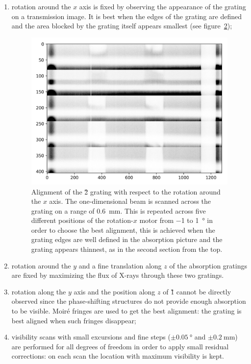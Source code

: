 \begin{enumerate}
\begin{figure}[htb]
            \label{fig:alignment-z}
        \end{figure}
    \item rotation around the $x$ axis is fixed by observing the appearance
        of the grating on a transmission image. It is best when the edges of
        the grating are defined and the area blocked by the grating itself
        appears smallest (see figure~\ref{fig:alignment-x});
        \begin{figure}[htb]
            \centering
            \includegraphics[width=\textwidth]{gfx/alignment-rot-x.png}
            \caption{Alignment of the \G2 grating with respect to the rotation
            around the $x$ axis. The one-dimensional beam is scanned across the
            grating on a range of \SI{0.6}{\milli\metre}. This is repeated across
            five different positions of the rotation-$x$ motor from \num{-1} to
            \SI{+1}{\degree} in order to choose the
            best alignment, this is achieved when the grating edges are well defined in
            the absorption picture and the grating appears thinnest, as in the second
        section from the top.}
            \label{fig:alignment-x}
        \end{figure}
    \item rotation around the $y$ and a fine translation along $z$ of the
        absorption gratings are fixed by maximizing the flux of X-rays
        through these two gratings.
    \item rotation along the $y$ axis and the position along $z$
        of \G{1} cannot be directly observed since the phase-shifting
        structures do not provide enough absorption to be visible.
        Moir\'e fringes are used to get the best alignment: the grating is
        best aligned when such fringes disappear;
    \item visibility scans with small excursions and fine steps
        ($\pm\SI{0.05}{\degree}$ and $\pm\SI{0.2}{\milli\meter}$) are
        performed for all degrees of freedom in order to apply small
        residual corrections: on each scan the location with maximum
        visibility is kept.
\end{enumerate}

